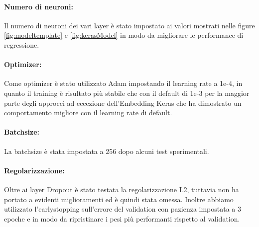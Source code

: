 \paragraph{Numero di neuroni:} Il numero di neuroni dei vari layer è stato
impostato ai valori mostrati nelle figure \ref{fig:modeltemplate} e
\ref{fig:kerasModel} in modo da migliorare le performance di regressione.

\paragraph{Optimizer:} Come optimizer è stato utilizzato Adam impostando il learning rate a 1e-4, in quanto il training è
risultato più stabile che con il default di 1e-3 per la maggior parte degli
approcci ad eccezione dell'Embedding Keras che ha dimostrato un comportamento
migliore con il learning rate di default.

\paragraph{Batchsize:} La batchsize è stata impostata a 256 dopo alcuni test
sperimentali.

\paragraph{Regolarizzazione:} Oltre ai layer Dropout è stato testata la
regolarizzazione L2, tuttavia non ha portato a evidenti miglioramenti ed è
quindi stata omessa. Inoltre abbiamo utilizzato l'earlystopping sull'errore del
validation con pazienza impostata a 3 epoche e in modo da ripristinare i pesi
più performanti rispetto al validation.
